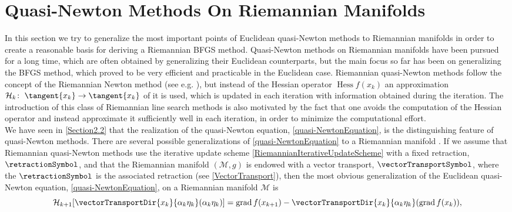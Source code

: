 \section{Quasi-Newton Methods On Riemannian Manifolds}
\label{Section4.2}

In this section we try to generalize the most important points of Euclidean quasi-Newton methods to Riemannian manifolds in order to create a reasonable basis for deriving a Riemannian BFGS method. Quasi-Newton methods on Riemannian manifolds have been pursued for a long time, which are often obtained by generalizing their Euclidean counterparts, but the main focus so far has been on generalizing the BFGS method, which proved to be very efficient and practicable in the Euclidean case. Riemannian quasi-Newton methods follow the concept of the Riemannian Newton method (see e.g. \cite[p.~113]{AbsilMahonySepulchre:2008}), but instead of the Hessian operator $\operatorname{Hess} f(x_k)$ an approximation $\mathcal{H}_k \colon \; \tangent{x_k} \to \tangent{x_k}$ of it is used, which is updated in each iteration with information obtained during the iteration. The introduction of this class of Riemannian line search methods is also motivated by the fact that one avoids the computation of the Hessian operator and instead approximate it sufficiently well in each iteration, in order to minimize the computational effort. \\
We have seen in \cref{Section2.2} that the realization of the quasi-Newton equation, \cref{quasi-NewtonEquation}, is the distinguishing feature of quasi-Newton methods. There are several possible generalizations of \cref{quasi-NewtonEquation} to a Riemannian manifold \cite[p.~17]{Huang:2013}. If we assume that Riemannian quasi-Newton methods use the iterative update scheme \cref{RiemannianIterativeUpdateScheme} with a fixed retraction, $\retractionSymbol$, and that the Riemannian manifold $(\mathcal{M}, g)$ is endowed with a vector transport, $\vectorTransportSymbol$, where the $\retractionSymbol$ is the associated retraction (see \cref{VectorTransport}), then the most obvious generalization of the Euclidean quasi-Newton equation, \cref{quasi-NewtonEquation}, on a Riemannian manifold $\mathcal{M}$ is
\begin{equation}\label{RiemannianQuasi-NewtonEquation}
    \mathcal{H}_{k+1} [\vectorTransportDir{x_k}{\alpha_k \eta_k}(\alpha_k \eta_k)] = \operatorname{grad} f(x_{k+1}) - \vectorTransportDir{x_k}{\alpha_k \eta_k}(\operatorname{grad} f(x_k)),
\end{equation}

